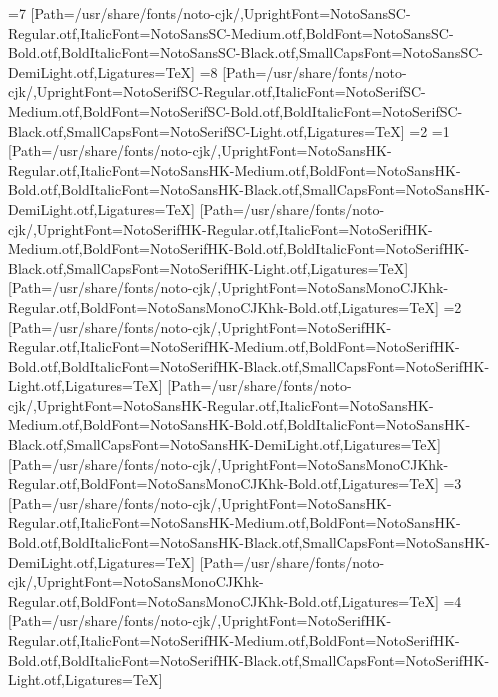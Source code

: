\else\ifnum\value{CJKFonts}=7
[Path=/usr/share/fonts/noto-cjk/,UprightFont=NotoSansSC-Regular.otf,ItalicFont=NotoSansSC-Medium.otf,BoldFont=NotoSansSC-Bold.otf,BoldItalicFont=NotoSansSC-Black.otf,SmallCapsFont=NotoSansSC-DemiLight.otf,Ligatures=TeX]
\else\ifnum\value{CJKFonts}=8
[Path=/usr/share/fonts/noto-cjk/,UprightFont=NotoSerifSC-Regular.otf,ItalicFont=NotoSerifSC-Medium.otf,BoldFont=NotoSerifSC-Bold.otf,BoldItalicFont=NotoSerifSC-Black.otf,SmallCapsFont=NotoSerifSC-Light.otf,Ligatures=TeX]
\fi\fi\fi\fi\fi\fi\fi\fi\else
\ifnum\value{CJKLanguage}=2
\ifnum\value{CJKFonts}=1
[Path=/usr/share/fonts/noto-cjk/,UprightFont=NotoSansHK-Regular.otf,ItalicFont=NotoSansHK-Medium.otf,BoldFont=NotoSansHK-Bold.otf,BoldItalicFont=NotoSansHK-Black.otf,SmallCapsFont=NotoSansHK-DemiLight.otf,Ligatures=TeX]
[Path=/usr/share/fonts/noto-cjk/,UprightFont=NotoSerifHK-Regular.otf,ItalicFont=NotoSerifHK-Medium.otf,BoldFont=NotoSerifHK-Bold.otf,BoldItalicFont=NotoSerifHK-Black.otf,SmallCapsFont=NotoSerifHK-Light.otf,Ligatures=TeX]
[Path=/usr/share/fonts/noto-cjk/,UprightFont=NotoSansMonoCJKhk-Regular.otf,BoldFont=NotoSansMonoCJKhk-Bold.otf,Ligatures=TeX]
\else\ifnum\value{CJKFonts}=2
[Path=/usr/share/fonts/noto-cjk/,UprightFont=NotoSerifHK-Regular.otf,ItalicFont=NotoSerifHK-Medium.otf,BoldFont=NotoSerifHK-Bold.otf,BoldItalicFont=NotoSerifHK-Black.otf,SmallCapsFont=NotoSerifHK-Light.otf,Ligatures=TeX]
[Path=/usr/share/fonts/noto-cjk/,UprightFont=NotoSansHK-Regular.otf,ItalicFont=NotoSansHK-Medium.otf,BoldFont=NotoSansHK-Bold.otf,BoldItalicFont=NotoSansHK-Black.otf,SmallCapsFont=NotoSansHK-DemiLight.otf,Ligatures=TeX]
[Path=/usr/share/fonts/noto-cjk/,UprightFont=NotoSansMonoCJKhk-Regular.otf,BoldFont=NotoSansMonoCJKhk-Bold.otf,Ligatures=TeX]
\else\ifnum\value{CJKFonts}=3
[Path=/usr/share/fonts/noto-cjk/,UprightFont=NotoSansHK-Regular.otf,ItalicFont=NotoSansHK-Medium.otf,BoldFont=NotoSansHK-Bold.otf,BoldItalicFont=NotoSansHK-Black.otf,SmallCapsFont=NotoSansHK-DemiLight.otf,Ligatures=TeX]
[Path=/usr/share/fonts/noto-cjk/,UprightFont=NotoSansMonoCJKhk-Regular.otf,BoldFont=NotoSansMonoCJKhk-Bold.otf,Ligatures=TeX]
\else\ifnum\value{CJKFonts}=4
[Path=/usr/share/fonts/noto-cjk/,UprightFont=NotoSerifHK-Regular.otf,ItalicFont=NotoSerifHK-Medium.otf,BoldFont=NotoSerifHK-Bold.otf,BoldItalicFont=NotoSerifHK-Black.otf,SmallCapsFont=NotoSerifHK-Light.otf,Ligatures=TeX]
